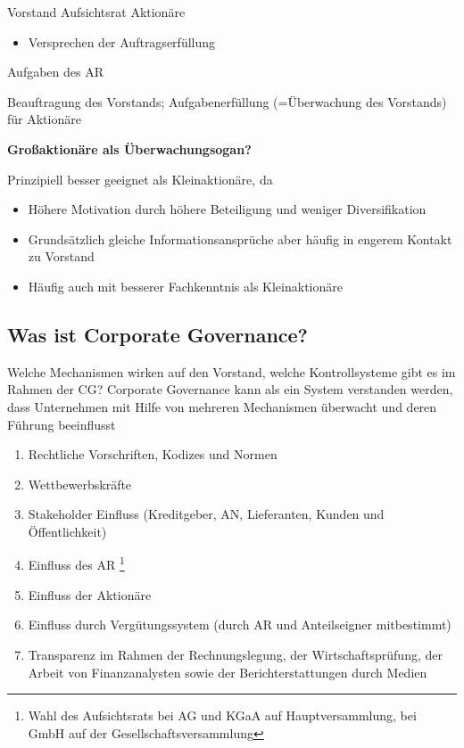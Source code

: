 \documentclass[
]{article}
\providecommand{\tightlist}{%
  \setlength{\itemsep}{0pt}\setlength{\parskip}{0pt}}
\begin{document}
Vorstand Aufsichtsrat Aktionäre

\begin{itemize}
\tightlist
\item
  Versprechen der Auftragserfüllung
\end{itemize}

Aufgaben des AR

Beauftragung des Vorstands; Aufgabenerfüllung (=Überwachung des
Vorstands) für Aktionäre

\textbf{Großaktionäre als Überwachungsogan?}

Prinzipiell besser geeignet als Kleinaktionäre, da

\begin{itemize}
\tightlist
\item
  Höhere Motivation durch höhere Beteiligung und weniger Diversifikation
\item
  Grundsätzlich gleiche Informationsansprüche aber häufig in engerem
  Kontakt zu Vorstand
\item
  Häufig auch mit besserer Fachkenntnis als Kleinaktionäre
\end{itemize}

\hypertarget{was-ist-corporate-governance}{%
\subsection{Was ist Corporate
Governance?}\label{was-ist-corporate-governance}}

Welche Mechanismen wirken auf den Vorstand, welche Kontrollsysteme gibt
es im Rahmen der CG? Corporate Governance kann als ein System verstanden
werden, dass Unternehmen mit Hilfe von mehreren Mechanismen überwacht
und deren Führung beeinflusst

\begin{enumerate}
\def\labelenumi{\arabic{enumi}.}
\tightlist
\item
  Rechtliche Vorschriften, Kodizes und Normen
\item
  Wettbewerbskräfte
\item
  Stakeholder Einfluss (Kreditgeber, AN, Lieferanten, Kunden und
  Öffentlichkeit)
\item
  Einfluss des AR \footnote{Wahl des Aufsichtsrats bei AG und KGaA auf
    Hauptversammlung, bei GmbH auf der Gesellschaftsversammlung}
\item
  Einfluss der Aktionäre
\item
  Einfluss durch Vergütungssystem (durch AR und Anteilseigner
  mitbestimmt)
\item
  Transparenz im Rahmen der Rechnungslegung, der Wirtschaftsprüfung, der
  Arbeit von Finanzanalysten sowie der Berichterstattungen durch Medien
\end{enumerate}
\end{document}
